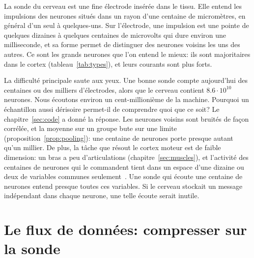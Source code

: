 La sonde du cerveau est une fine électrode insérée dans le tissu. Elle entend les impulsions des neurones situés dans un rayon d'une centaine de micromètres, en général d'un seul à quelques-uns. Sur l'électrode, une impulsion est une pointe de quelques dizaines à quelques centaines de microvolts qui dure environ une milliseconde, et sa forme permet de distinguer des neurones voisins les uns des autres. Ce sont les grands neurones  que l'on entend le mieux: ils sont majoritaires dans le cortex (tableau~\ref{tab:types}), et leurs courants sont plus forts.

La difficulté principale saute aux yeux. Une bonne sonde compte aujourd'hui des centaines ou des milliers d'électrodes, alors que le cerveau contient $8.6\cdot10^{10}$ neurones. Nous écoutons environ un cent-millionième de la machine. Pourquoi un échantillon aussi dérisoire permet-il de comprendre quoi que ce soit? Le chapitre~\ref{sec:code} a donné la réponse. Les neurones voisins sont bruités de façon corrélée, et la moyenne sur un groupe bute sur une limite (proposition~\ref{prop:pooling}): une centaine de neurones porte presque autant qu'un millier. De plus, la tâche que résout le cortex moteur est de faible dimension: un bras a peu d'articulations (chapitre~\ref{sec:muscles}), et l'activité des centaines de neurones qui le commandent tient dans un espace d'une dizaine ou deux de variables communes seulement~\cite{Gallego2017}. Une sonde qui écoute une centaine de neurones entend presque toutes ces variables. Si le cerveau stockait un message indépendant dans chaque neurone, une telle écoute serait inutile.

\section{Le flux de données: compresser sur la sonde}

